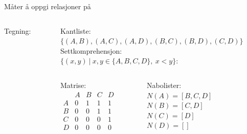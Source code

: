\begin{frame}[fragile]{Måter å oppgi relasjoner på}
    \begin{columns}
        \begin{column}{0.3\textwidth}
            Tegning:

        \end{column}
        \begin{column}{0.65\textwidth}
            \pause
            Kantliste:\\
            $\{(A, B), (A, C), (A, D), (B, C), (B, D), (C, D)\}$\\[5mm]
            \pause
            Settkomprehensjon:\\
            $\{(x, y) ~ | ~ x, y \in \{A,B,C,D\}, ~ x < y\}$:\\[5mm]
            \pause
            \begin{columns}
                \begin{column}{0.27\textwidth}
                    Matrise:\\
                    \begin{math}
                        \begin{matrix}
                              & A & B & C & D\\
                            A & 0 & 1 & 1 & 1\\
                            B & 0 & 0 & 1 & 1\\
                            C & 0 & 0 & 0 & 1\\
                            D & 0 & 0 & 0 & 0
                        \end{matrix}
                    \end{math}
                \end{column}
                \pause
                \begin{column}{0.38\textwidth}
                    Nabolister:\\        
                    $N(A) = [B, C, D]$\\
                    $N(B) = [C, D]$\\
                    $N(C) = [D]$\\
                    $N(D) = []$
                \end{column} 
                \begin{column}{0.1\textwidth}
                \end{column}
            \end{columns}
        \end{column}
    \end{columns}
\end{frame}




